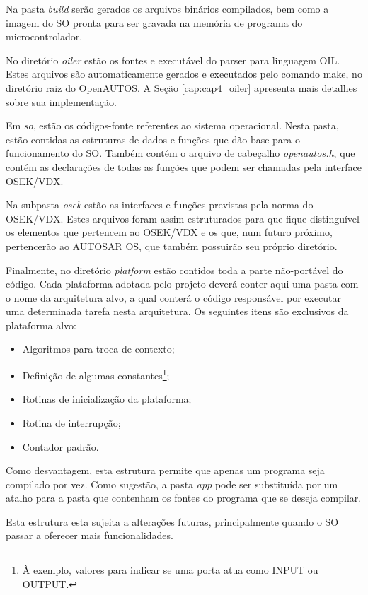 \documentclass[conference,compsoc]{IEEEtran}
\newcommand{\reftop}[1]{Seção \ref{cap:#1}}
\begin{document}
Na pasta \emph{build} serão gerados os arquivos binários compilados, bem como a imagem do SO pronta para ser gravada na memória de programa do microcontrolador.

No diretório \emph{oiler} estão os fontes e executável do parser para linguagem OIL. Estes arquivos são automaticamente gerados e executados pelo comando make, no diretório raiz do OpenAUTOS. A \reftop{cap4_oiler} apresenta mais detalhes sobre sua implementação.

Em \emph{so}, estão os códigos-fonte referentes ao sistema operacional. Nesta pasta, estão contidas as estruturas de dados e funções que dão base para o funcionamento do SO. Também contém o arquivo de cabeçalho \emph{openautos.h}, que contém as declarações de todas as funções que podem ser chamadas pela interface OSEK/VDX. 

Na subpasta \emph{osek} estão as interfaces e funções previstas pela norma do OSEK/VDX. Estes arquivos foram assim estruturados para que fique distinguível os elementos que pertencem ao OSEK/VDX e os que, num futuro próximo, pertencerão ao AUTOSAR OS, que também possuirão seu próprio diretório.

Finalmente, no diretório \emph{platform} estão contidos toda a parte não-portável do código. Cada plataforma adotada pelo projeto deverá conter aqui uma pasta com o nome da arquitetura alvo, a qual conterá o código responsável por executar uma determinada tarefa nesta arquitetura. Os seguintes itens são exclusivos da plataforma alvo:

\begin{itemize}
	\item Algoritmos para troca de contexto;
	\item Definição de algumas constantes\footnote{À exemplo, valores para indicar se uma porta atua como INPUT ou OUTPUT.};
	\item Rotinas de inicialização da plataforma;
	\item Rotina de interrupção;
	\item Contador padrão.
\end{itemize}

Como desvantagem, esta estrutura permite que apenas um programa seja compilado por vez. Como sugestão, a pasta \emph{app} pode ser substituída por um atalho para a pasta que contenham os fontes do programa que se deseja compilar.

Esta estrutura esta sujeita a alterações futuras, principalmente quando o SO passar a oferecer mais funcionalidades.
\end{document}
